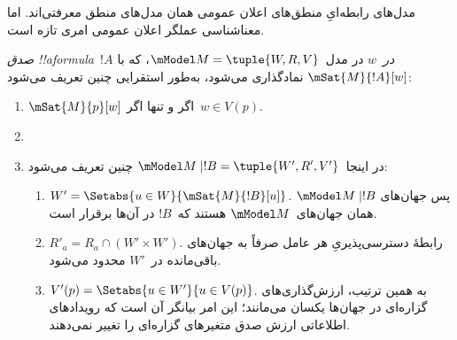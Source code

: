 \documentclass[../../../include/open-logic-section]{subfiles}
\begin{document}


مدل‌های رابطه‌ایِ منطق‌های اعلان عمومی همان مدل‌های منطق معرفتی‌اند.
اما معناشناسی عملگر اعلان عمومی امری تازه است.

\begin{defn} \emph{صدق !!a{formula}~$!A$
  در~$w$} در مدل~$\mModel M = \tuple{W, R, V}$، که با
  $\mSat{M}{!A}[w]$ نمادگذاری می‌شود، به‌طور استقرایی چنین تعریف می‌شود:
  \begin{enumerate}
  \item $\mSat{M}{p}[w]$ اگر و تنها اگر~$w \in V(p)$.
  \item{}
  \item{}

  در اینجا~$\mModel M \mid !B = \tuple{W', R', V'}$ چنین تعریف می‌شود:
  \begin{enumerate}
    \item $W' = \Setabs{ u \in W}{\mSat{M}{!B}[u]}$. پس جهان‌های
      $\mModel M \mid !B$ همان جهان‌های~$\mModel M$ هستند که~$!B$
      در آن‌ها برقرار است.
    \item $R'_a = R_a \cap (W' \times W')$. رابطهٔ دسترسی‌پذیریِ هر
      عامل صرفاً به جهان‌های باقی‌مانده در~$W'$ محدود می‌شود.
    \item $V'(p) = \Setabs{ u \in W'}{u \in V(p) }$. به همین ترتیب،
      ارزش‌گذاری‌های گزاره‌ای در جهان‌ها یکسان می‌مانند؛ این امر بیانگر
      آن است که رویدادهای اطلاعاتی ارزش صدق متغیرهای گزاره‌ای را تغییر
      نمی‌دهند.
  \end{enumerate}
  
  \end{enumerate}
\end{defn}
\end{document}
